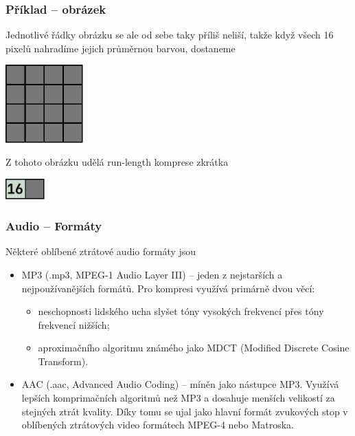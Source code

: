 \documentclass[aspectratio=169,11pt,svgnames]{beamer}
\begin{document}
\begin{frame}
 \frametitle{Příklad -- obrázek}
 Jednotlivé řádky obrázku se ale od sebe taky příliš neliší, takže když všech 16
 pixelů nahradíme jejich průměrnou barvou, dostaneme
 \begin{center}
  \includegraphics[width=3cm]{lossy-4.pdf}
  \vspace*{-.5em}
 \end{center}
 \pause
 Z tohoto obrázku udělá run-length komprese zkrátka
 \begin{center}
  \includegraphics[width=1.5cm]{lossy-5.pdf}
  \vspace*{-.5em}
 \end{center}
\end{frame}

\begin{frame}
 \frametitle{Audio -- Formáty}
 Některé oblíbené \alert{ztrátové} audio formáty jsou
 \begin{itemize}[label=\textbullet]
  \item \alert{MP3} (.mp3, MPEG-1 Audio Layer III) -- jeden z nejstarších a
   nejpoužívanějších formátů. Pro kompresi využívá primárně dvou věcí:
  \begin{itemize}[label=\textemdash]
   \item neschopnosti lidského ucha slyšet tóny vysokých frekvencí přes tóny
    frekvencí nižších;
   \item aproximačního algoritmu známého jako \alert{MDCT} (Modified Discrete
    Cosine Transform).
  \end{itemize}
  \pause
  \item \alert{AAC} (.aac, Advanced Audio Coding) -- míněn jako nástupce MP3.
   Využívá lepších komprimačních algoritmů než MP3 a dosahuje menších velikostí
   za stejných ztrát kvality. Díky tomu se ujal jako hlavní formát zvukových
   stop v oblíbených ztrátových video formátech MPEG-4 nebo Matroska.
 \end{itemize}
\end{frame}
\end{document}
